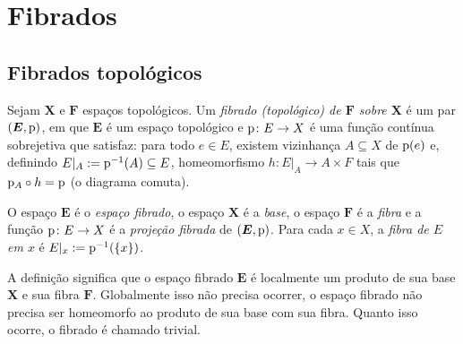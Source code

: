 \chapter{Fibrados}

\section{Fibrados topológicos}

\begin{definition}
Sejam $\bm X$ e $\bm F$ espaços topológicos. Um \emph{fibrado (topológico) de $\bm F$ sobre $\bm X$} é um par $(\bm E,\mathrm{p})$, em que $\bm E$ é um espaço topológico e $\mathrm{p}\colon E \to X$ é uma função contínua sobrejetiva que satisfaz: para todo $e \in E$, existem vizinhança $A \subseteq X$ de $\mathrm{p}(e)$ e, definindo $E|_A := \mathrm{p}^{-1}(A) \subseteq E$, homeomorfismo $h\colon E|_A \to A \times F$ tais que $\mathrm{p}_A \circ h = \mathrm{p}$ (o diagrama comuta).
\begin{figure}
\centering
{}
\end{figure}
O espaço $\bm E$ é o \emph{espaço fibrado}, o espaço $\bm X$ é a \emph{base}, o espaço $\bm F$ é a \emph{fibra} e a função $\mathrm{p}\colon E \to X$ é a \emph{projeção fibrada} de $(\bm E,\mathrm{p})$. Para cada $x \in X$,  a \emph{fibra de $E$ em $x$} é $E|_x := \mathrm{p}^{-1}(\{x\})$.
\end{definition}

A definição significa que o espaço fibrado $\bm E$ é localmente um produto de sua base $\bm X$ e sua fibra $\bm F$. Globalmente isso não precisa ocorrer, o espaço fibrado não precisa ser homeomorfo ao produto de sua base com sua fibra. Quanto isso ocorre, o fibrado é chamado trivial.

